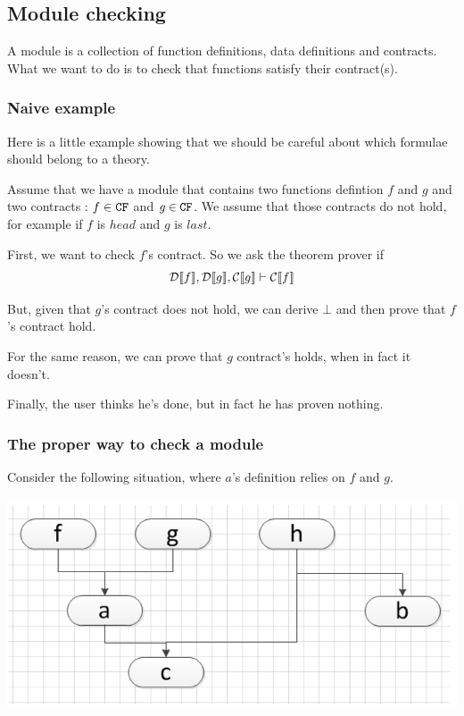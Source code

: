 \documentclass[preprint]{sigplanconf}
\begin{document}
\subsection{Module checking}
A module is a collection of function definitions, data definitions and
contracts. What we want to do is to check that functions satisfy their
contract(s). 

\subsubsection{Naive example}
Here is a little example showing that we should be careful about which
formulae should belong to a theory.

Assume that we have a module that contains two functions defintion $f$
and $g$ and two contracts : $f \in \texttt{CF}$ and $g \in \texttt{CF}$. We assume
that those contracts do not hold, for example if $f$ is $head$ and $g$
is $last$.

First, we want to check $f$'s contract. So we ask the theorem prover
if
$$ \mathcal{D} \llbracket f \rrbracket, \mathcal{D} \llbracket g \rrbracket, \mathcal{C} \llbracket g \rrbracket \vdash \mathcal{C} \llbracket f \rrbracket $$

But, given that $g$'s contract does not hold, we can derive $\bot$ and
then prove that $f$'s contract hold.

For the same reason, we can prove that $g$ contract's holds, when in
fact it doesn't.

Finally, the user thinks he's done, but in fact he has proven nothing.

\subsubsection{The proper way to check a module}
Consider the following situation, where $a$'s definition relies on $f$
and $g$.
\begin{center}
\includegraphics[scale=0.3]{flow.png}
\end{center}
\end{document}
